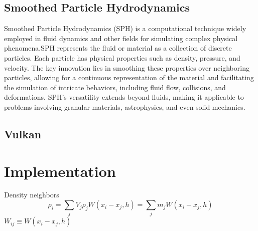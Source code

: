 \documentclass[intern]{cgMA}
\begin{document}
    \subsection{Smoothed Particle Hydrodynamics}
    Smoothed Particle Hydrodynamics (SPH) is a computational technique widely employed in fluid dynamics and other fields for simulating complex physical phenomena.SPH represents the fluid or material as a collection of discrete particles. Each particle has physical properties such as density, pressure, and velocity. The key innovation lies in smoothing these properties over neighboring particles, allowing for a continuous representation of the material and facilitating the simulation of intricate behaviors, including fluid flow, collisions, and deformations. SPH's versatility extends beyond fluids, making it applicable to problems involving granular materials, astrophysics, and even solid mechanics. 

    
    \subsection{Vulkan}
    
    \section{Implementation}
    
    Density neighbors
    \begin{equation}
        \rho_i = \sum_j V_j \rho_j W(x_i - x_j, h)
        = \sum_j m_j W(x_i - x_j, h)
    \end{equation}
    $ W_{ij} \equiv W(x_i - x_j, h)$\\
    
\end{document}
